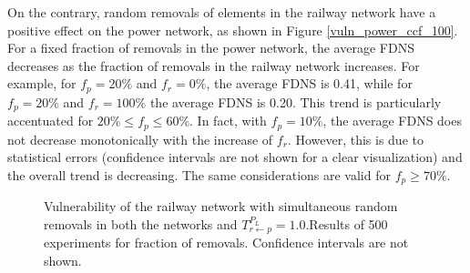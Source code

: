 \documentclass[review]{elsarticle}
\begin{document}
On the contrary, random removals of elements in the railway network have a positive effect on the power network, as shown in Figure \ref{vuln_power_ccf_100}. For a fixed fraction of removals in the power network, the average FDNS decreases as the fraction of removals in the railway network increases. For example, for $f_p=20\%$ and $f_r=0\%$, the average FDNS is 0.41, while for $f_p=20\%$ and $f_r=100\%$ the average FDNS is 0.20. This trend is particularly accentuated for $20\% \le f_p \le 60\%$. In fact, with $f_p=10\%$, the average FDNS does not decrease monotonically with the increase of $f_r$. However, this is due to statistical errors (confidence intervals are not shown for a clear visualization) and the overall trend is decreasing. The same considerations are valid for $f_p \ge 70\%$.







	\begin{figure}[h]
	\centering
	\caption{Vulnerability of the railway network with simultaneous random removals in both the networks and $T_{r \leftarrow p}^{P_L}=1.0$.Results of 500 experiments for fraction of removals. Confidence intervals are not shown.}
	\label{vuln_rail_ccf_100}
\end{figure}
\end{document}

